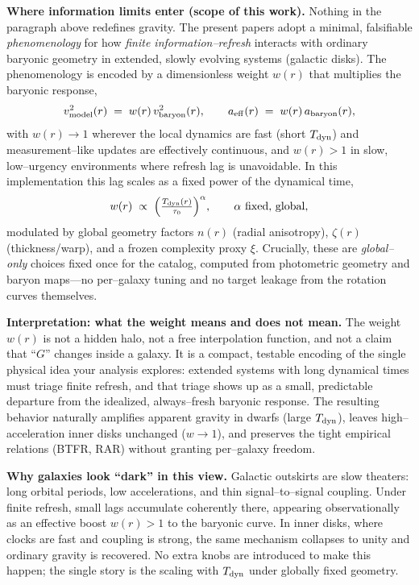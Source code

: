 \documentclass[usenatbib]{mnras}
\begin{document}
\vspace{0.5em}
\noindent\textbf{Where information limits enter (scope of this work).}
Nothing in the paragraph above redefines gravity. The present papers adopt a minimal, falsifiable \emph{phenomenology} for how \emph{finite information–refresh} interacts with ordinary baryonic geometry in extended, slowly evolving systems (galactic disks). The phenomenology is encoded by a dimensionless weight \(w(r)\) that multiplies the baryonic response,
\[
v_{\rm model}^2(r) \;=\; w(r)\,v_{\rm baryon}^2(r),
\qquad
a_{\rm eff}(r) \;=\; w(r)\,a_{\rm baryon}(r),
\]
with \(w(r)\to 1\) wherever the local dynamics are fast (short \(T_{\rm dyn}\)) and measurement–like updates are effectively continuous, and \(w(r)>1\) in slow, low–urgency environments where refresh lag is unavoidable. In this implementation this lag scales as a fixed power of the dynamical time,
\[
w(r)\;\propto\;\Big(\tfrac{T_{\rm dyn}(r)}{\tau_0}\Big)^{\alpha},
\qquad \alpha \text{ fixed, global},
\]
modulated by global geometry factors \(n(r)\) (radial anisotropy), \(\zeta(r)\) (thickness/warp), and a frozen complexity proxy \(\xi\).
Crucially, these are \emph{global–only} choices fixed once for the catalog, computed from photometric geometry and baryon maps—no per–galaxy tuning and no target leakage from the rotation curves themselves.

\vspace{0.5em}
\noindent\textbf{Interpretation: what the weight means and does not mean.}
The weight \(w(r)\) is not a hidden halo, not a free interpolation function, and not a claim that “\(\!G\!\)” changes inside a galaxy. It is a compact, testable encoding of the single physical idea your analysis explores:
extended systems with long dynamical times must triage finite refresh, and that triage shows up as a small, predictable departure from the idealized, always–fresh baryonic response.
The resulting behavior naturally amplifies apparent gravity in dwarfs (large \(T_{\rm dyn}\)), leaves high–acceleration inner disks unchanged (\(w\to 1\)), and preserves the tight empirical relations (BTFR, RAR) without granting per–galaxy freedom.

\vspace{0.5em}
\noindent\textbf{Why galaxies look ``dark'' in this view.}
Galactic outskirts are slow theaters: long orbital periods, low accelerations, and thin signal–to–signal coupling. Under finite refresh, small lags accumulate coherently there, appearing observationally as an effective boost \(w(r)>1\) to the baryonic curve. In inner disks, where clocks are fast and coupling is strong, the same mechanism collapses to unity and ordinary gravity is recovered. No extra knobs are introduced to make this happen; the single story is the scaling with \(T_{\rm dyn}\) under globally fixed geometry.
\end{document}
